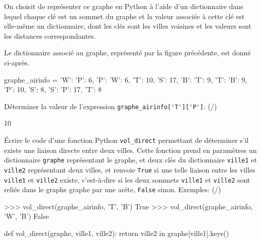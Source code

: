 On choisit de représenter ce graphe en Python à l'aide d'un dictionnaire dans lequel chaque clé est un sommet du graphe et la valeur associée à cette clé est elle-même un dictionnaire, dont les clés sont les villes voisines et les valeurs sont les distances correspondantes.


Le dictionnaire associé au graphe, représenté par la figure précédente, est donné ci-après.

\begin{CodePythontexAlt}[TaillePolice=\large, Largeur=1\linewidth,Centre,Lignes=true,PremLigne=1]{}
graphe_airinfo = {     
    'W': {'P': 6}, 
    'P': {'W': 6, 'T': 10, 'S': 17}, 
    'B': {'T': 9}, 
    'T': {'B': 9, 'P': 10, 'S': 8}, 
    'S': {'P': 17, 'T': 8}     }
    \end{CodePythontexAlt}

\begin{enumerate}[resume=monDS]
    \begin{minipage}{0.69\linewidth}
            \item Déterminer la valeur de l'expression \verb|graphe_airinfo['T']['P']|. (/)

    \end{minipage}\hfill
    \begin{minipage}{0.29\linewidth}
    \begin{blocvisible}[height=1]
     10
\end{blocvisible}
        \end{minipage}
\item Écrire le code d'une fonction Python \texttt{vol\_direct} permettant de déterminer s'il existe une liaison directe entre deux villes. Cette fonction prend en paramètres un dictionnaire \texttt{graphe} représentant le graphe, et deux clés du dictionnaire \texttt{ville1} et \texttt{ville2} représentant deux villes, et renvoie \texttt{True} si une telle liaison entre les villes \texttt{ville1} et \texttt{ville2} existe, c'est-à-dire si les deux sommets \texttt{ville1} et \texttt{ville2} sont reliés dans le graphe graphe par une arête, \texttt{False} sinon. Exemples: (/)
    \begin{CodePythontexAlt}[TaillePolice=\large, Largeur=1\linewidth,Centre,Lignes=true,PremLigne=1]{}
>>> vol_direct(graphe_airinfo, 'T', 'B') 
True 
>>> vol_direct(graphe_airinfo, 'W', 'B') 
False
    \end{CodePythontexAlt}

\begin{blocvisible}[height=3.5]
\begin{CodePythontexAlt}[TaillePolice=\large, Largeur=1\linewidth,Centre,Lignes=true,PremLigne=1]{}
def vol_direct(graphe, ville1, ville2):
    return ville2 in graphe[ville1].keys()
\end{CodePythontexAlt}
\end{blocvisible}


\end{enumerate}

